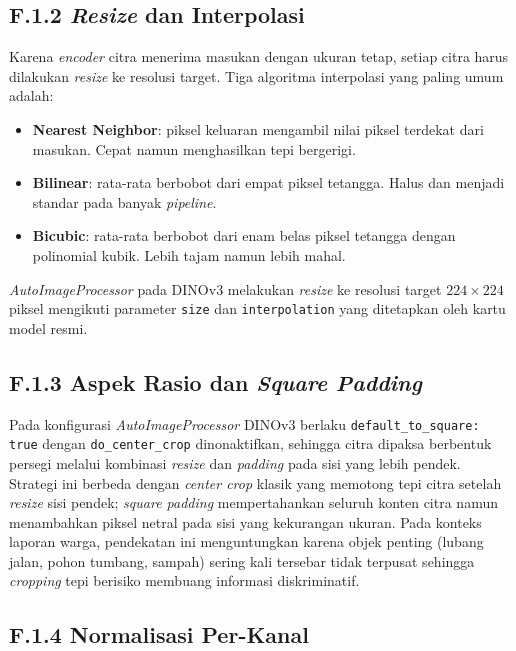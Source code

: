 \subsection*{F.1.2 \textit{Resize} dan Interpolasi}

Karena \textit{encoder} citra menerima masukan dengan ukuran tetap, setiap citra harus dilakukan \textit{resize} ke resolusi target. Tiga algoritma interpolasi yang paling umum adalah:

\begin{itemize}
    \item \textbf{Nearest Neighbor}: piksel keluaran mengambil nilai piksel terdekat dari masukan. Cepat namun menghasilkan tepi bergerigi.
    \item \textbf{Bilinear}: rata-rata berbobot dari empat piksel tetangga. Halus dan menjadi standar pada banyak \textit{pipeline}.
    \item \textbf{Bicubic}: rata-rata berbobot dari enam belas piksel tetangga dengan polinomial kubik. Lebih tajam namun lebih mahal.
\end{itemize}

\textit{AutoImageProcessor} pada DINOv3 melakukan \textit{resize} ke resolusi target $224 \times 224$ piksel mengikuti parameter \texttt{size} dan \texttt{interpolation} yang ditetapkan oleh kartu model resmi.

\subsection*{F.1.3 Aspek Rasio dan \textit{Square Padding}}

Pada konfigurasi \textit{AutoImageProcessor} DINOv3 berlaku \texttt{default\_to\_square: true} dengan \texttt{do\_center\_crop} dinonaktifkan, sehingga citra dipaksa berbentuk persegi melalui kombinasi \textit{resize} dan \textit{padding} pada sisi yang lebih pendek. Strategi ini berbeda dengan \textit{center crop} klasik yang memotong tepi citra setelah \textit{resize} sisi pendek; \textit{square padding} mempertahankan seluruh konten citra namun menambahkan piksel netral pada sisi yang kekurangan ukuran. Pada konteks laporan warga, pendekatan ini menguntungkan karena objek penting (lubang jalan, pohon tumbang, sampah) sering kali tersebar tidak terpusat sehingga \textit{cropping} tepi berisiko membuang informasi diskriminatif.

\subsection*{F.1.4 Normalisasi Per-Kanal}

